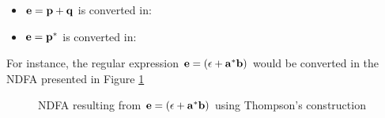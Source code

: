\begin{itemize}
    \item  $\bf e = p + q$ is converted in:
    \begin{figure}[H]
        \begin{center}
        \end{center} 
    \end{figure}
    
    \item  $\bf e = p^*$ is converted in:
    \begin{figure}[H]
        \begin{center}
        \end{center} 
    \end{figure}
\end{itemize}

For instance, the regular expression $\bf e = (\epsilon + a^*b)$ would be converted in the NDFA presented in Figure \ref{fig:ndfaT}

\begin{figure}
    \centering
    \caption{NDFA resulting from $\bf e = (\epsilon + a^*b)$ using Thompson's construction }
    \label{fig:ndfaT}
\end{figure}



